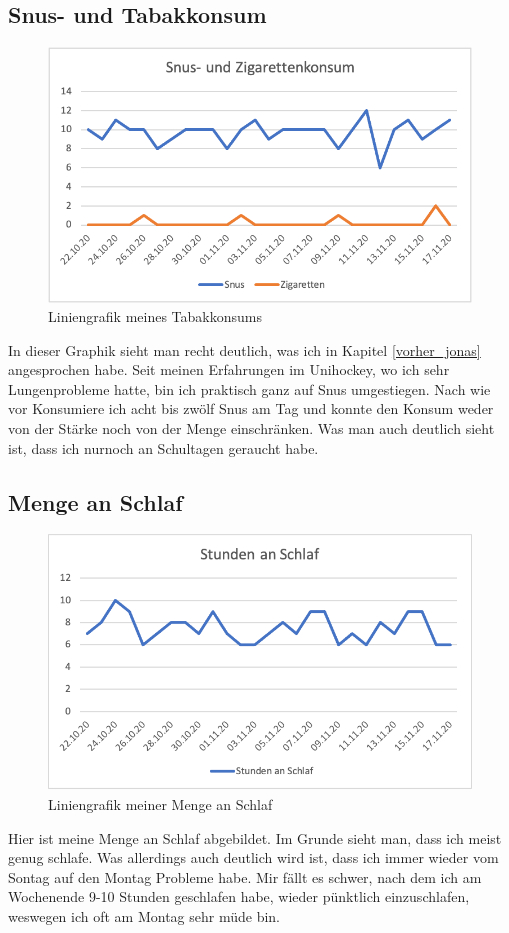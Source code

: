 \subsection{Snus- und Tabakkonsum}
\begin{figure}[!ht]
  \centering
  \includegraphics[width=0.6\linewidth]{./images/tabak_jonas.png}
  \caption{Liniengrafik meines Tabakkonsums}
  \label{fig:tabak_jonas}
\end{figure}
In dieser Graphik sieht man recht deutlich, was ich in Kapitel \ref{vorher_jonas} angesprochen habe. Seit meinen Erfahrungen im Unihockey, wo ich sehr Lungenprobleme hatte, bin ich praktisch ganz auf Snus umgestiegen. Nach wie vor Konsumiere ich acht bis zwölf Snus am Tag und konnte den Konsum weder von der Stärke noch von der Menge einschränken. Was man auch deutlich sieht ist, dass ich nurnoch an Schultagen geraucht habe. 
\subsection{Menge an Schlaf}
\begin{figure}[!ht]
  \centering
  \includegraphics[width=0.6\linewidth]{./images/schlaf_jonas.png}
  \caption{Liniengrafik meiner Menge an Schlaf}
  \label{fig:schlaf_jonas}
\end{figure}
Hier ist meine Menge an Schlaf abgebildet. Im Grunde sieht man, dass ich meist genug schlafe. Was allerdings auch deutlich wird ist, dass ich immer wieder vom Sontag auf den Montag Probleme habe. Mir fällt es schwer, nach dem ich am Wochenende 9-10 Stunden geschlafen habe, wieder pünktlich einzuschlafen, weswegen ich oft am Montag sehr müde bin.
